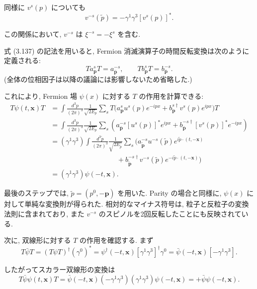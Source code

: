\documentclass[a4paper,12pt]{article}
\begin{document}
同様に $v^s(p)$ についても
\begin{equation*}
v^{-s}(\tilde{p}) = -\gamma^1\gamma^3 [v^s(p)]^* .
\end{equation*}

この関係において, $v^{-s}$ は $\xi^{-s}=-\xi^s$ を含む.

式 (3.137) の記法を用いると, Fermion 消滅演算子の時間反転変換は次のように定義される:
\begin{equation}
Ta^s_{\mathbf{p}}T = a^{-s}_{\bar{\mathbf{p}}}, 
\qquad 
Tb^s_{\mathbf{p}}T = b^{-s}_{\bar{\mathbf{p}}}.
\tag{3.138}
\end{equation}
(全体の位相因子は以降の議論には影響しないため省略した.)

これにより, Fermion 場 $\psi(x)$ に対する $T$ の作用を計算できる:
\begin{align*}
T\psi(t,\mathbf{x})T 
&= \int \frac{d^3p}{(2\pi)^3}\frac{1}{\sqrt{2E_p}}
\sum_s T\Big( a^s_{\mathbf{p}} u^s(p)e^{-ipx} + b^{s\dagger}_{\mathbf{p}} v^s(p)e^{ipx} \Big) T \\
&= \int \frac{d^3p}{(2\pi)^3}\frac{1}{\sqrt{2E_p}}
\sum_s \left( a^{-s}_{\bar{\mathbf{p}}}[u^s(p)]^* e^{ipx}
+ b^{-s\dagger}_{\bar{\mathbf{p}}}[v^s(p)]^* e^{-ipx} \right) \\
&= (\gamma^1\gamma^3)\int \frac{d^3\tilde{p}}{(2\pi)^3}\frac{1}{\sqrt{2E_{\tilde{p}}}}
\sum_s \Big( a^{-s}_{\tilde{\mathbf{p}}}u^{-s}(\tilde{p})e^{i\tilde{p}\cdot(t,-\mathbf{x})} \\
&\hspace{4cm}
+ b^{-s\dagger}_{\tilde{\mathbf{p}}} v^{-s}(\tilde{p})e^{-i\tilde{p}\cdot(t,-\mathbf{x})} \Big) \\
&= (\gamma^1\gamma^3)\psi(-t,\mathbf{x}).
\tag{3.139}
\end{align*}

最後のステップでは, $\tilde{p}=(p^0,-\mathbf{p})$ を用いた.  
Parity の場合と同様に, $\psi(x)$ に対して単純な変換則が得られた.  
相対的なマイナス符号は, 粒子と反粒子の変換法則に含まれており, また $v^{-s}$ のスピノルを2回反転したことにも反映されている.

次に, 双線形に対する $T$ の作用を確認する.  
まず
\begin{equation*}
T\bar{\psi}T = (T\psi T)^\dagger(\gamma^0)^* 
= \psi^\dagger(-t,\mathbf{x})[\gamma^1\gamma^3]^\dagger\gamma^0 
= \bar{\psi}(-t,\mathbf{x})[-\gamma^1\gamma^3].
\tag{3.140}
\end{equation*}

したがってスカラー双線形の変換は
\begin{equation*}
T\bar{\psi}\psi(t,\mathbf{x})T 
= \bar{\psi}(-t,\mathbf{x})(-\gamma^1\gamma^3)(\gamma^1\gamma^3)\psi(-t,\mathbf{x}) 
= +\bar{\psi}\psi(-t,\mathbf{x}).
\tag{3.141}
\end{equation*}
\end{document}

